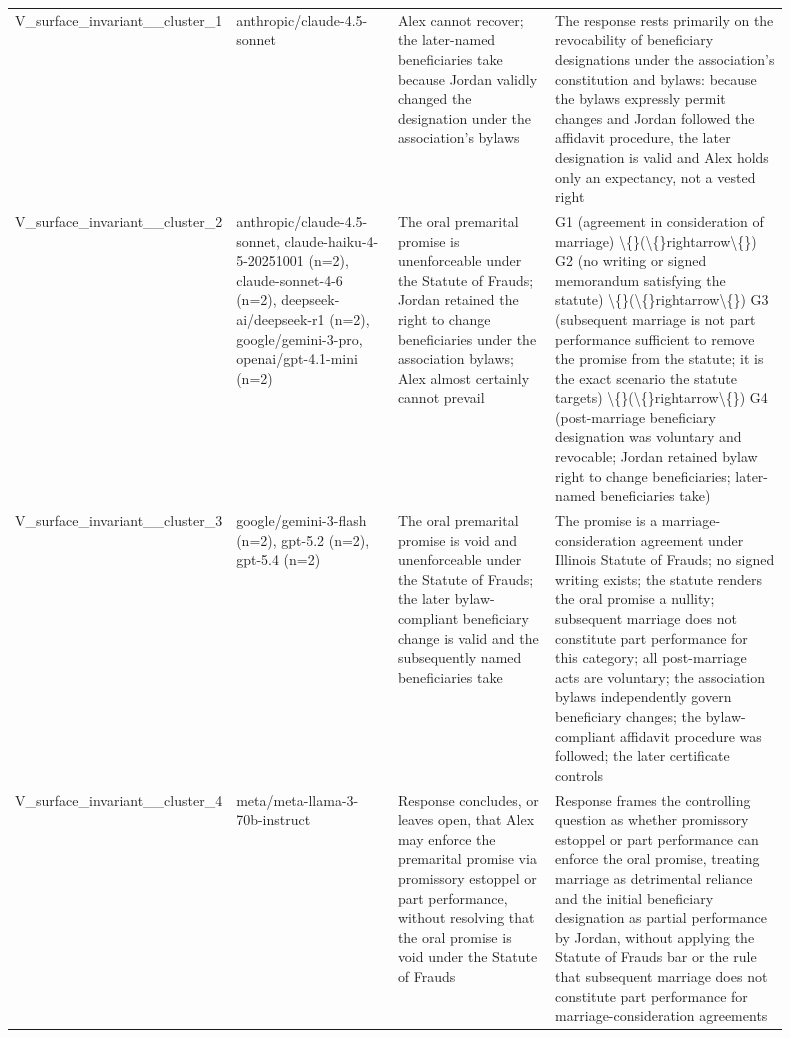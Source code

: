 \begin{longtable}{p{0.12\linewidth}p{0.22\linewidth}p{0.22\linewidth}p{0.34\linewidth}}
V\_surface\_invariant\_\_cluster\_1 & anthropic/claude-4.5-sonnet & Alex cannot recover; the later-named beneficiaries take because Jordan validly changed the designation under the association's bylaws & The response rests primarily on the revocability of beneficiary designations under the association's constitution and bylaws: because the bylaws expressly permit changes and Jordan followed the affidavit procedure, the later designation is valid and Alex holds only an expectancy, not a vested right \\
V\_surface\_invariant\_\_cluster\_2 & anthropic/claude-4.5-sonnet, claude-haiku-4-5-20251001 (n=2), claude-sonnet-4-6 (n=2), deepseek-ai/deepseek-r1 (n=2), google/gemini-3-pro, openai/gpt-4.1-mini (n=2) & The oral premarital promise is unenforceable under the Statute of Frauds; Jordan retained the right to change beneficiaries under the association bylaws; Alex almost certainly cannot prevail & G1 (agreement in consideration of marriage) \textbackslash\{\}(\textbackslash\{\}rightarrow\textbackslash\{\}) G2 (no writing or signed memorandum satisfying the statute) \textbackslash\{\}(\textbackslash\{\}rightarrow\textbackslash\{\}) G3 (subsequent marriage is not part performance sufficient to remove the promise from the statute; it is the exact scenario the statute targets) \textbackslash\{\}(\textbackslash\{\}rightarrow\textbackslash\{\}) G4 (post-marriage beneficiary designation was voluntary and revocable; Jordan retained bylaw right to change beneficiaries; later-named beneficiaries take) \\
V\_surface\_invariant\_\_cluster\_3 & google/gemini-3-flash (n=2), gpt-5.2 (n=2), gpt-5.4 (n=2) & The oral premarital promise is void and unenforceable under the Statute of Frauds; the later bylaw-compliant beneficiary change is valid and the subsequently named beneficiaries take & The promise is a marriage-consideration agreement under Illinois Statute of Frauds; no signed writing exists; the statute renders the oral promise a nullity; subsequent marriage does not constitute part performance for this category; all post-marriage acts are voluntary; the association bylaws independently govern beneficiary changes; the bylaw-compliant affidavit procedure was followed; the later certificate controls \\
V\_surface\_invariant\_\_cluster\_4 & meta/meta-llama-3-70b-instruct & Response concludes, or leaves open, that Alex may enforce the premarital promise via promissory estoppel or part performance, without resolving that the oral promise is void under the Statute of Frauds & Response frames the controlling question as whether promissory estoppel or part performance can enforce the oral promise, treating marriage as detrimental reliance and the initial beneficiary designation as partial performance by Jordan, without applying the Statute of Frauds bar or the rule that subsequent marriage does not constitute part performance for marriage-consideration agreements \\

\end{longtable}
